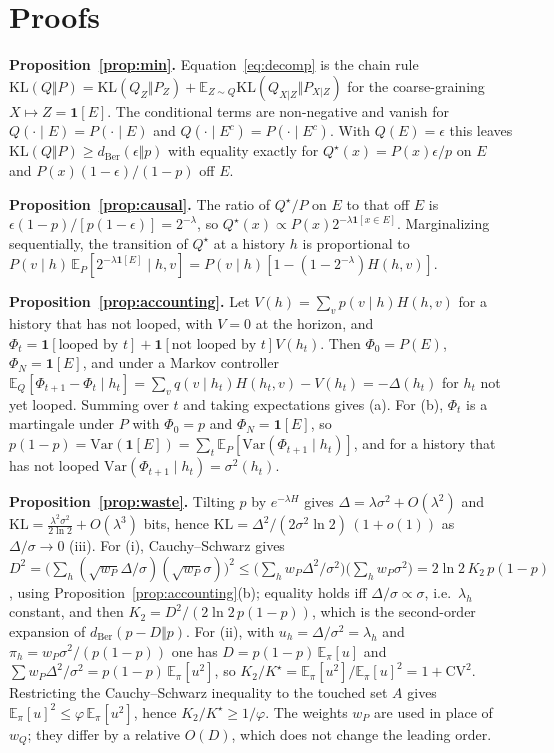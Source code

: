 \documentclass[make,article,submit,pdftex]{Definitions/mdpi}
\providecommand{\KL}{}\renewcommand{\KL}{\mathrm{KL}}
\providecommand{\E}{}\renewcommand{\E}{\mathbb{E}}
\begin{document}
\appendixstart
\appendix
\section{Proofs}\label{app:proofs}

\textbf{Proposition~\ref{prop:min}.} Equation~\eqref{eq:decomp} is the chain rule $\KL(Q\Vert P)=\KL(Q_Z\Vert P_Z)+\E_{Z\sim Q}\KL(Q_{X|Z}\Vert P_{X|Z})$ for the coarse-graining $X\mapsto Z=\mathbf{1}[E]$. The conditional terms are non-negative and vanish for $Q(\cdot\mid E)=P(\cdot\mid E)$ and $Q(\cdot\mid E^c)=P(\cdot\mid E^c)$. With $Q(E)=\epsilon$ this leaves $\KL(Q\Vert P)\ge d_{\mathrm{Ber}}(\epsilon\Vert p)$ with equality exactly for $Q^\star(x)=P(x)\epsilon/p$ on $E$ and $P(x)(1-\epsilon)/(1-p)$ off $E$.

\textbf{Proposition~\ref{prop:causal}.} The ratio of $Q^\star/P$ on $E$ to that off $E$ is $\epsilon(1-p)/[p(1-\epsilon)]=2^{-\lambda}$, so $Q^\star(x)\propto P(x)2^{-\lambda\mathbf{1}[x\in E]}$. Marginalizing sequentially, the transition of $Q^\star$ at a history $h$ is proportional to $P(v\mid h)\,\E_P[2^{-\lambda\mathbf{1}[E]}\mid h,v]=P(v\mid h)[1-(1-2^{-\lambda})H(h,v)]$.

\textbf{Proposition~\ref{prop:accounting}.} Let $V(h)=\sum_vp(v\mid h)H(h,v)$ for a history that has not looped, with $V=0$ at the horizon, and $\Phi_t=\mathbf{1}[\text{looped by }t]+\mathbf{1}[\text{not looped by }t]V(h_t)$. Then $\Phi_0=P(E)$, $\Phi_N=\mathbf{1}[E]$, and under a Markov controller $\E_Q[\Phi_{t+1}-\Phi_t\mid h_t]=\sum_vq(v\mid h_t)H(h_t,v)-V(h_t)=-\Delta(h_t)$ for $h_t$ not yet looped. Summing over $t$ and taking expectations gives (a). For (b), $\Phi_t$ is a martingale under $P$ with $\Phi_0=p$ and $\Phi_N=\mathbf{1}[E]$, so $p(1-p)=\mathrm{Var}(\mathbf{1}[E])=\sum_t\E_P[\mathrm{Var}(\Phi_{t+1}\mid h_t)]$, and for a history that has not looped $\mathrm{Var}(\Phi_{t+1}\mid h_t)=\sigma^2(h_t)$.

\textbf{Proposition~\ref{prop:waste}.} Tilting $p$ by $e^{-\lambda H}$ gives $\Delta=\lambda\sigma^2+O(\lambda^2)$ and $\KL=\frac{\lambda^2\sigma^2}{2\ln2}+O(\lambda^3)$ bits, hence $\KL=\Delta^2/(2\sigma^2\ln2)\,(1+o(1))$ as $\Delta/\sigma\to0$ (iii). For (i), Cauchy--Schwarz gives $D^2=\big(\sum_h(\sqrt{w_P}\Delta/\sigma)(\sqrt{w_P}\sigma)\big)^2\le\big(\sum_hw_P\Delta^2/\sigma^2\big)\big(\sum_hw_P\sigma^2\big)=2\ln2\,K_2\,p(1-p)$, using Proposition~\ref{prop:accounting}(b); equality holds iff $\Delta/\sigma\propto\sigma$, i.e.\ $\lambda_h$ constant, and then $K_2=D^2/(2\ln2\,p(1-p))$, which is the second-order expansion of $d_{\mathrm{Ber}}(p-D\Vert p)$. For (ii), with $u_h=\Delta/\sigma^2=\lambda_h$ and $\pi_h=w_P\sigma^2/(p(1-p))$ one has $D=p(1-p)\,\E_\pi[u]$ and $\sum w_P\Delta^2/\sigma^2=p(1-p)\,\E_\pi[u^2]$, so $K_2/K^\star=\E_\pi[u^2]/\E_\pi[u]^2=1+\mathrm{CV}^2$. Restricting the Cauchy--Schwarz inequality to the touched set $A$ gives $\E_\pi[u]^2\le\varphi\,\E_\pi[u^2]$, hence $K_2/K^\star\ge1/\varphi$. The weights $w_P$ are used in place of $w_Q$; they differ by a relative $O(D)$, which does not change the leading order.
\end{document}
